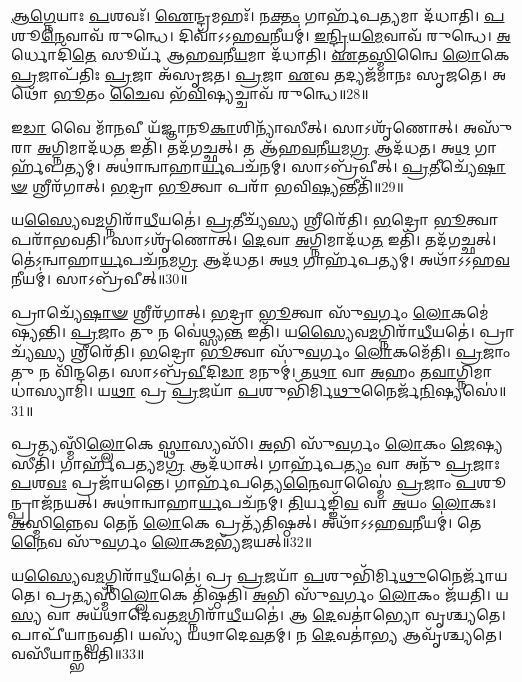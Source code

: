 \-\ul{𑌆}\-\-\ul{𑌗𑍍𑌨𑍇}\-𑌯𑌾𑌃 \ul{𑌪}\-𑌶𑌵𑌃᳴।
\-\ul{𑌐}\-𑌨𑍍𑌦𑍍𑌰𑌮𑌹𑌃᳴।
𑌨\-\ul{𑌕𑍍𑌤𑌂} 𑌗𑌾𑌰𑍍\mbox{}𑌹᳴𑌪\-\ul{𑌤𑍍𑌯}\-𑌮𑌾 𑌦᳴𑌧𑌾𑌤𑌿।
\-\ul{𑌪}\-𑌶𑍂\-\ul{𑌨𑍇}\-𑌵𑌾𑌵᳴ 𑌰𑍁𑌨𑍍𑌧𑍇।
𑌦𑌿𑌵𑌾᳴𑌽𑌽𑌹\-\ul{𑌵}\-𑌨𑍀𑌯𑌮𑍍॑।
\-\ul{𑌇}\-\-\ul{𑌨𑍍𑌦𑍍𑌰𑌿}\-𑌯\-\ul{𑌮𑍇}\-𑌵𑌾𑌵᳴ 𑌰𑍁𑌨𑍍𑌧𑍇।
\-\ul{𑌅}\-𑌰𑍍𑌧𑍋𑌦𑌿᳴\-\ul{𑌤𑍇} 𑌸𑍂𑌰𑍍𑌯᳴ 𑌆𑌹\-\ul{𑌵}\-𑌨𑍀\-\ul{𑌯}\-𑌮𑌾 𑌦᳴𑌧𑌾𑌤𑌿।
\-\ul{𑌏}\-𑌤\-\ul{𑌸𑍍𑌮𑌿}\-𑌨𑍍𑌵𑍈 \ul{𑌲𑍋}\-𑌕𑍇 \ul{𑌪𑍍𑌰}\-𑌜𑌾\-𑌪᳴𑌤𑌿𑌃 \ul{𑌪𑍍𑌰}\-𑌜𑌾 𑌅᳴\-𑌸𑍃𑌜𑌤।
\-\ul{𑌪𑍍𑌰}\-𑌜𑌾 \ul{𑌏}\-𑌵 𑌤𑌦𑍍𑌯𑌜᳴𑌮𑌾𑌨𑌃 𑌸𑍃𑌜𑌤𑍇।
𑌅𑌥𑍋᳴ \ul{𑌭𑍂}\-𑌤𑌂 \ul{𑌚𑍈}\-𑌵 𑌭᳴\-\ul{𑌵𑌿}\-𑌷𑍍𑌯𑌚𑍍𑌚𑌾𑌵᳴ 𑌰𑍁𑌨𑍍𑌧𑍇॥28॥

𑌇\-\ul{𑌡𑌾} 𑌵𑍈 𑌮𑌾᳴\-\ul{𑌨}\-𑌵𑍀 𑌯᳴𑌜𑍍𑌞𑌾𑌨𑍂\-\ul{𑌕𑌾}\-𑌶𑌿𑌨𑍍𑌯𑌾᳴𑌸𑍀𑌤𑍍।
𑌸𑌾𑌽𑌶𑍃᳴𑌣𑍋𑌤𑍍।
𑌅𑌸𑍁᳴𑌰𑌾 \ul{𑌅}\-𑌗𑍍𑌨𑌿𑌮𑌾𑌦᳴𑌧\-\ul{𑌤} 𑌇𑌤𑌿᳴।
𑌤𑌦᳴𑌗𑌚𑍍𑌛𑌤𑍍।
𑌤 𑌆᳴𑌹\-\ul{𑌵}\-𑌨𑍀\-\ul{𑌯}\-𑌮\-\ul{𑌗𑍍𑌰} 𑌆𑌦᳴𑌧𑌤।
𑌅\-\ul{𑌥} 𑌗𑌾𑌰𑍍\mbox{}𑌹᳴𑌪𑌤𑍍𑌯𑌮𑍍।
𑌅𑌥𑌾॑𑌨𑍍𑌵𑌾𑌹𑌾\-\ul{𑌰𑍍𑌯}\-𑌪𑌚᳴𑌨𑌮𑍍।
𑌸𑌾𑌽𑌬𑍍𑌰᳴𑌵𑍀𑌤𑍍।
\-\ul{𑌪𑍍𑌰}\-𑌤𑍀𑌚𑍍𑌯𑍇᳴\-\ul{𑌷𑌾}\-\-\ul{𑍟} 𑌶𑍍𑌰𑍀𑌰᳴𑌗𑌾𑌤𑍍।
\-\ul{𑌭}\-𑌦𑍍𑌰𑌾 \ul{𑌭𑍂}\-𑌤𑍍𑌵𑌾 𑌪𑌰𑌾᳴ 𑌭𑌵𑌿\-\ul{𑌷𑍍𑌯}\-𑌨𑍍𑌤𑍀𑌤𑌿᳴॥29॥

𑌯\-\ul{𑌸𑍍𑌯𑍈}\-𑌵\-\ul{𑌮}\-𑌗𑍍𑌨𑌿𑌰𑌾᳴\-\ul{𑌧𑍀}\-𑌯𑌤𑍇॑।
\-\ul{𑌪𑍍𑌰}\-𑌤𑍀𑌚𑍍𑌯᳴\-\ul{𑌸𑍍𑌯} 𑌶𑍍𑌰𑍀𑌰𑍇᳴𑌤𑌿।
\-\ul{𑌭}\-𑌦𑍍𑌰𑍋 \ul{𑌭𑍂}\-𑌤𑍍𑌵𑌾 𑌪𑌰𑌾᳴𑌭𑌵𑌤𑌿।
𑌸𑌾𑌽𑌶𑍃᳴𑌣𑍋𑌤𑍍।
\-\ul{𑌦𑍇}\-𑌵𑌾 \ul{𑌅}\-𑌗𑍍𑌨𑌿𑌮𑌾𑌦᳴𑌧\-\ul{𑌤} 𑌇𑌤𑌿᳴।
𑌤𑌦᳴𑌗𑌚𑍍𑌛𑌤𑍍।
𑌤𑍇॑𑌽𑌨𑍍𑌵𑌾𑌹𑌾\-\ul{𑌰𑍍𑌯}\-𑌪𑌚᳴\-\ul{𑌨}\-𑌮\-\ul{𑌗𑍍𑌰} 𑌆𑌦᳴𑌧𑌤।
𑌅\-\ul{𑌥} 𑌗𑌾𑌰𑍍\mbox{}𑌹᳴𑌪𑌤𑍍𑌯𑌮𑍍।
𑌅𑌥𑌾᳴𑌽𑌽𑌹\-\ul{𑌵}\-𑌨𑍀\-𑌯𑌮𑍍॑।
𑌸𑌾𑌽𑌬𑍍𑌰᳴𑌵𑍀𑌤𑍍॥30॥

𑌪𑍍𑌰𑌾𑌚𑍍𑌯𑍇᳴\-\ul{𑌷𑌾}\-\-\ul{𑍟} 𑌶𑍍𑌰𑍀𑌰᳴𑌗𑌾𑌤𑍍।
\-\ul{𑌭}\-𑌦𑍍𑌰𑌾 \ul{𑌭𑍂}\-𑌤𑍍𑌵𑌾 𑌸𑍁᳴\-\ul{𑌵}\-𑌰𑍍𑌗𑌂 \ul{𑌲𑍋}\-𑌕𑌮𑍇॑𑌷𑍍𑌯𑌨𑍍𑌤𑌿।
\-\ul{𑌪𑍍𑌰}\-𑌜𑌾𑌂 𑌤𑍁 𑌨 𑌵𑍇॑𑌥𑍍𑌸𑍍𑌯\-\ul{𑌨𑍍𑌤} 𑌇𑌤𑌿᳴।
𑌯\-\ul{𑌸𑍍𑌯𑍈}\-𑌵\-\ul{𑌮}\-𑌗𑍍𑌨𑌿𑌰𑌾᳴\-\ul{𑌧𑍀}\-𑌯𑌤𑍇॑।
𑌪𑍍𑌰𑌾𑌚𑍍𑌯᳴\-\ul{𑌸𑍍𑌯} 𑌶𑍍𑌰𑍀𑌰𑍇᳴𑌤𑌿।
\-\ul{𑌭}\-𑌦𑍍𑌰𑍋 \ul{𑌭𑍂}\-𑌤𑍍𑌵𑌾 𑌸𑍁᳴\-\ul{𑌵}\-𑌰𑍍𑌗𑌂 \ul{𑌲𑍋}\-𑌕𑌮𑍇᳴𑌤𑌿।
\-\ul{𑌪𑍍𑌰}\-𑌜𑌾𑌂 𑌤𑍁 𑌨 𑌵𑌿᳴𑌨𑍍𑌦𑌤𑍇।
𑌸𑌾𑌽𑌬𑍍𑌰᳴\-\ul{𑌵𑍀}\-𑌦𑌿\-\ul{𑌡𑌾} 𑌮𑌨𑍁𑌮𑍍॑।
𑌤\-\ul{𑌥𑌾} 𑌵𑌾 \ul{𑌅}\-𑌹𑌂 𑌤\-\ul{𑌵𑌾}\-𑌗𑍍𑌨𑌿𑌮𑌾𑌧𑌾॑𑌸𑍍𑌯𑌾𑌮𑌿।
𑌯\-\ul{𑌥𑌾} 𑌪𑍍𑌰 \ul{𑌪𑍍𑌰}\-𑌜𑌯𑌾᳴ \ul{𑌪}\-𑌶𑍁𑌭𑌿᳴𑌰𑍍𑌮𑌿\-\ul{𑌥𑍁}\-𑌨𑍈𑌰𑍍𑌜᳴\-\ul{𑌨𑌿}\-𑌷𑍍𑌯𑌸𑍇॑॥31॥

𑌪𑍍𑌰\-\ul{𑌤𑍍𑌯}\-𑌸𑍍𑌮𑌿𑌁\-\ul{𑌲𑍍𑌲𑍋}\-𑌕𑍇 \ul{𑌸𑍍𑌥𑌾}\-𑌸𑍍𑌯𑌸𑌿᳴।
\-\ul{𑌅}\-𑌭𑌿 𑌸𑍁᳴\-\ul{𑌵}\-𑌰𑍍𑌗𑌂 \ul{𑌲𑍋}\-𑌕𑌂 \ul{𑌜𑍇}\-𑌷𑍍𑌯𑌸𑍀𑌤𑌿᳴।
𑌗𑌾𑌰𑍍\mbox{}𑌹᳴𑌪\-\ul{𑌤𑍍𑌯}\-𑌮\-\ul{𑌗𑍍𑌰} 𑌆𑌦᳴𑌧𑌾𑌤𑍍।
𑌗𑌾𑌰𑍍\mbox{}𑌹᳴𑌪\-\ul{𑌤𑍍𑌯𑌂} 𑌵𑌾 𑌅𑌨𑍁᳴ \ul{𑌪𑍍𑌰}\-𑌜𑌾𑌃 \ul{𑌪}\-𑌶\-\ul{𑌵𑌃} 𑌪𑍍𑌰𑌜𑌾᳴𑌯𑌨𑍍𑌤𑍇।
𑌗𑌾𑌰𑍍\mbox{}𑌹᳴𑌪𑌤𑍍𑌯𑍇\-\ul{𑌨𑍈}\-𑌵𑌾𑌸𑍍𑌮𑍈॑ \ul{𑌪𑍍𑌰}\-𑌜𑌾𑌂 \ul{𑌪}\-𑌶𑍂𑌨𑍍𑌪𑍍𑌰𑌾𑌜᳴𑌨𑌯𑌤𑍍।
𑌅𑌥𑌾॑𑌨𑍍𑌵𑌾𑌹𑌾\-\ul{𑌰𑍍𑌯}\-𑌪𑌚᳴𑌨𑌮𑍍।
\-\ul{𑌤𑌿}\-𑌰𑍍𑌯𑌙𑍍𑌙𑌿᳴\-\ul{𑌵} 𑌵𑌾 \ul{𑌅}\-𑌯𑌂 \ul{𑌲𑍋}\-𑌕𑌃।
\-\ul{𑌅}\-𑌸𑍍𑌮𑌿\-\ul{𑌨𑍍𑌨𑍇}\-𑌵 𑌤𑍇𑌨᳴ \ul{𑌲𑍋}\-𑌕𑍇 𑌪𑍍𑌰𑌤𑍍𑌯᳴𑌤𑌿𑌷𑍍𑌠𑌤𑍍।
𑌅𑌥𑌾᳴𑌽𑌽𑌹\-\ul{𑌵}\-𑌨𑍀𑌯𑌮𑍍॑।
𑌤𑍇\-\ul{𑌨𑍈}\-𑌵 𑌸𑍁᳴\-\ul{𑌵}\-𑌰𑍍𑌗𑌂 \ul{𑌲𑍋}\-𑌕\-\ul{𑌮}\-𑌭𑍍𑌯᳴𑌜𑌯𑌤𑍍॥32॥

𑌯\-\ul{𑌸𑍍𑌯𑍈}\-𑌵\-\ul{𑌮}\-𑌗𑍍𑌨𑌿𑌰𑌾᳴\-\ul{𑌧𑍀}\-𑌯𑌤𑍇॑।
𑌪𑍍𑌰 \ul{𑌪𑍍𑌰}\-𑌜𑌯𑌾᳴ \ul{𑌪}\-𑌶𑍁𑌭𑌿᳴𑌰𑍍𑌮𑌿\-\ul{𑌥𑍁}\-𑌨𑍈𑌰𑍍𑌜𑌾᳴𑌯𑌤𑍇।
𑌪𑍍𑌰\-\ul{𑌤𑍍𑌯}\-𑌸𑍍𑌮𑌿𑌁\-\ul{𑌲𑍍𑌲𑍋}\-𑌕𑍇 𑌤𑌿᳴𑌷𑍍𑌠𑌤𑌿।
\-\ul{𑌅}\-𑌭𑌿 𑌸𑍁᳴\-\ul{𑌵}\-𑌰𑍍𑌗𑌂 \ul{𑌲𑍋}\-𑌕𑌂 𑌜᳴𑌯𑌤𑌿।
𑌯\-\ul{𑌸𑍍𑌯} 𑌵𑌾 𑌅𑌯᳴𑌥𑌾𑌦𑍇𑌵𑌤\-\ul{𑌮}\-𑌗𑍍𑌨𑌿𑌰𑌾᳴\-\ul{𑌧𑍀}\-𑌯𑌤𑍇॑।
𑌆 \ul{𑌦𑍇}\-𑌵𑌤𑌾॑𑌭𑍍𑌯𑍋 𑌵𑍃𑌶𑍍𑌚𑍍𑌯𑌤𑍇।
𑌪𑌾𑌪𑍀᳴𑌯𑌾𑌨𑍍𑌭𑌵𑌤𑌿।
𑌯𑌸𑍍𑌯᳴ 𑌯𑌥𑌾𑌦𑍇\-\ul{𑌵}\-𑌤𑌮𑍍।
𑌨 \ul{𑌦𑍇}\-𑌵𑌤𑌾॑\-\ul{𑌭𑍍𑌯} 𑌆𑌵𑍃᳴𑌶𑍍𑌚𑍍𑌯𑌤𑍇।
𑌵𑌸𑍀᳴𑌯𑌾𑌨𑍍𑌭𑌵𑌤𑌿॥33॥

